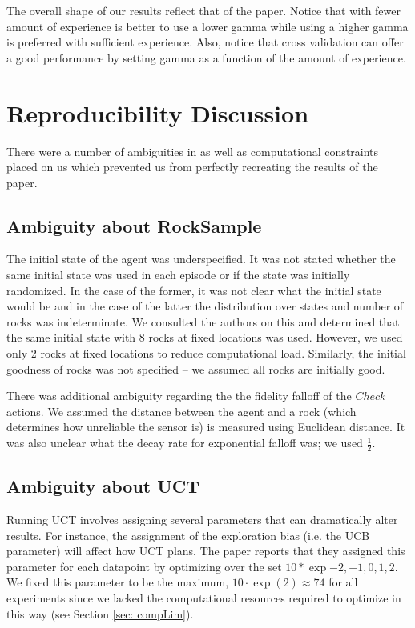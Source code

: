 \documentclass[11pt,twocolumn]{article}
\begin{document}
The overall shape of our results reflect that of the paper. Notice that with fewer amount of experience is better to use a lower gamma while using a higher gamma is preferred with sufficient experience. Also, notice that cross validation can offer a good performance by setting gamma as a function of the amount of experience. 
\section{Reproducibility Discussion}
\label{sec: repDisc}

There were a number of ambiguities in \cite{jiang2015dependence} as well as computational constraints placed on us which prevented us from perfectly recreating the results of the paper. 

\subsection{Ambiguity about RockSample}
The initial state of the agent was underspecified. It was not stated whether the same initial state was used in each episode or if the state was initially randomized. In the case of the former, it was not clear what the initial state would be and in the case of the latter the distribution over states and number of rocks was indeterminate. We consulted the authors on this and determined that the same initial state with 8 rocks at fixed locations was used. However, we used only 2 rocks at fixed locations to reduce computational load. Similarly, the initial goodness of rocks was not specified -- we assumed all rocks are initially good.

There was additional ambiguity regarding the the fidelity falloff of the $Check$ actions. We assumed the distance between the agent and a rock (which determines how unreliable the sensor is) is measured using Euclidean distance. It was also unclear what the decay rate for exponential falloff was; we used $\frac{1}{2}$.

\subsection{Ambiguity about UCT}

Running UCT involves assigning several parameters that can dramatically alter results. For instance, the assignment of the exploration bias (i.e. the UCB parameter) will affect how UCT plans. The paper reports that they assigned this parameter for each datapoint by optimizing over the set $10 * \exp{-2, -1, 0, 1, 2}$. We fixed this parameter to be the maximum, $10 \cdot \exp(2) \approx 74$ for all experiments since we lacked the computational resources required to optimize in this way (see Section \ref{sec: compLim}).
\end{document}
